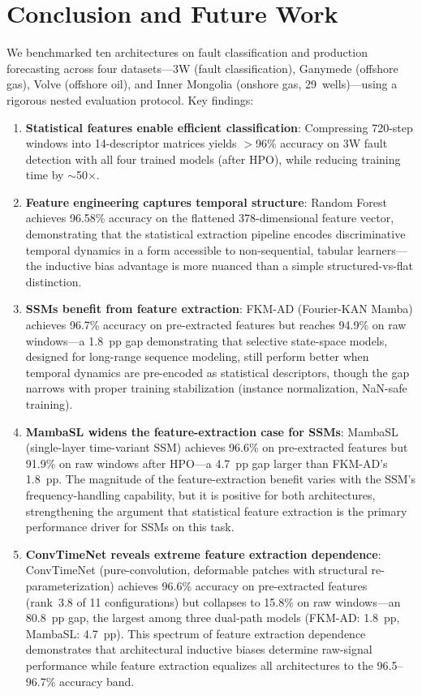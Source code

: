 \documentclass[conference]{IEEEtran}
\begin{document}
\section{Conclusion and Future Work}
\label{sec:conclusion}

We benchmarked ten architectures on fault classification and production forecasting across four datasets---3W (fault classification), Ganymede (offshore gas), Volve (offshore oil), and Inner Mongolia (onshore gas, 29~wells)---using a rigorous nested evaluation protocol. Key findings:

\begin{enumerate}
    \item \textbf{Statistical features enable efficient classification}: Compressing 720-step windows into 14-descriptor matrices yields $>$96\% accuracy on 3W fault detection with all four trained models (after HPO), while reducing training time by $\sim$50$\times$.
    \item \textbf{Feature engineering captures temporal structure}: Random Forest achieves 96.58\% accuracy on the flattened 378-dimensional feature vector, demonstrating that the statistical extraction pipeline encodes discriminative temporal dynamics in a form accessible to non-sequential, tabular learners---the inductive bias advantage is more nuanced than a simple structured-vs-flat distinction.
    \item \textbf{SSMs benefit from feature extraction}: FKM-AD (Fourier-KAN Mamba) achieves 96.7\% accuracy on pre-extracted features but reaches 94.9\% on raw windows---a 1.8~pp gap demonstrating that selective state-space models, designed for long-range sequence modeling, still perform better when temporal dynamics are pre-encoded as statistical descriptors, though the gap narrows with proper training stabilization (instance normalization, NaN-safe training).
    \item \textbf{MambaSL widens the feature-extraction case for SSMs}: MambaSL \cite{mambasl} (single-layer time-variant SSM) achieves 96.6\% on pre-extracted features but 91.9\% on raw windows after HPO---a 4.7~pp gap larger than FKM-AD's 1.8~pp. The magnitude of the feature-extraction benefit varies with the SSM's frequency-handling capability, but it is positive for both architectures, strengthening the argument that statistical feature extraction is the primary performance driver for SSMs on this task.
    \item \textbf{ConvTimeNet reveals extreme feature extraction dependence}: ConvTimeNet \cite{convtimenet} (pure-convolution, deformable patches with structural re-parameterization) achieves 96.6\% accuracy on pre-extracted features (rank~3.8 of 11 configurations) but collapses to 15.8\% on raw windows---an 80.8~pp gap, the largest among three dual-path models (FKM-AD: 1.8~pp, MambaSL: 4.7~pp). This spectrum of feature extraction dependence demonstrates that architectural inductive biases determine raw-signal performance while feature extraction equalizes all architectures to the 96.5--96.7\% accuracy band.

\end{enumerate}
\end{document}
